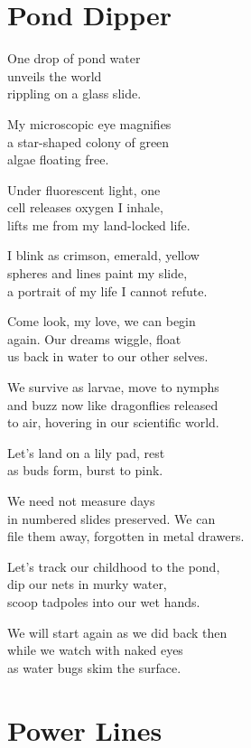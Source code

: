 \documentclass[twoside,10pt]{book}
\begin{document}
\clearpage
\section{Pond Dipper}

One drop of pond water\\
unveils the world\\
rippling on a glass slide.

My microscopic eye magnifies\\
a star-shaped colony of green\\
algae floating free.

Under fluorescent light, one\\
cell releases oxygen I inhale,\\
lifts me from my land-locked life.

I blink as crimson, emerald, yellow\\
spheres and lines paint my slide,\\
a portrait of my life I cannot refute.

Come look, my love, we can begin\\
again. Our dreams wiggle, float\\
us back in water to our other selves.

We survive as larvae, move to nymphs\\
and buzz now like dragonflies released\\
to air, hovering in our scientific world.

Let's land on a lily pad, rest\\
as buds form, burst to pink.

We need not measure days\\
in numbered slides preserved. We can\\
file them away, forgotten in metal drawers.

Let's track our childhood to the pond,\\
dip our nets in murky water,\\
scoop tadpoles into our wet hands.

We will start again as we did back then\\
while we watch with naked eyes\\
as water bugs skim the surface.


\clearpage
\section{Power Lines}
\end{document}
